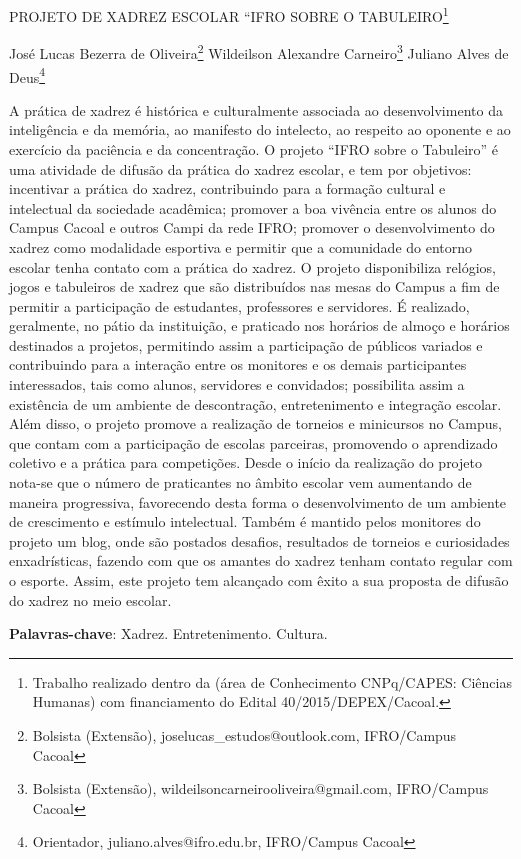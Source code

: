 \documentclass[article,12pt,onesidea,4paper,english,brazil]{abntex2}
\begin{document}
	
	
	\frenchspacing 
	
	\begin{center}
		\LARGE PROJETO DE XADREZ ESCOLAR “IFRO SOBRE O TABULEIRO\footnote{Trabalho realizado dentro da (área de Conhecimento CNPq/CAPES: Ciências Humanas) com financiamento do Edital 40/2015/DEPEX/Cacoal.}
		
		\normalsize
		José Lucas Bezerra de Oliveira\footnote{Bolsista (Extensão), joselucas\_estudos@outlook.com, IFRO/Campus Cacoal} 
		Wildeilson Alexandre Carneiro\footnote{Bolsista (Extensão), wildeilsoncarneirooliveira@gmail.com, IFRO/Campus Cacoal} 
		Juliano Alves de Deus\footnote{Orientador, juliano.alves@ifro.edu.br, IFRO/Campus Cacoal} 
	 
	\end{center}
	
	\noindent A prática de xadrez é histórica e culturalmente associada ao desenvolvimento da inteligência e da memória, ao manifesto do intelecto, ao respeito ao oponente e ao exercício da paciência e da concentração. O projeto “IFRO sobre o Tabuleiro” é uma atividade de difusão da prática do xadrez escolar, e tem por objetivos: incentivar a prática do xadrez, contribuindo para a formação cultural e intelectual da sociedade acadêmica; promover a boa vivência entre os alunos do Campus Cacoal e outros Campi da rede IFRO; promover o desenvolvimento do xadrez como modalidade esportiva e permitir que a comunidade do entorno escolar tenha contato com a prática do xadrez. O projeto disponibiliza relógios, jogos e tabuleiros de xadrez que são distribuídos nas mesas do Campus a fim de permitir a participação de estudantes, professores e servidores. É realizado, geralmente, no pátio da instituição, e praticado nos horários de almoço e horários destinados a projetos, permitindo assim a participação de públicos variados e contribuindo para a interação entre os monitores e os demais participantes interessados, tais como alunos, servidores e convidados; possibilita assim a existência de um ambiente de descontração, entretenimento e integração escolar. Além disso, o projeto promove a realização de torneios e minicursos no Campus, que contam com a participação de escolas parceiras, promovendo o aprendizado coletivo e a prática para competições. Desde o início da realização do projeto nota-se que o número de praticantes no âmbito escolar vem aumentando de maneira progressiva, favorecendo desta forma o desenvolvimento de um ambiente de crescimento e estímulo intelectual. Também é mantido pelos monitores do projeto um blog, onde são postados desafios, resultados de torneios e curiosidades enxadrísticas, fazendo com que os amantes do xadrez tenham contato regular com o esporte. Assim, este projeto tem alcançado com êxito a sua proposta de difusão do xadrez no meio escolar.
	
	\vspace{\onelineskip}
	
	\noindent
	\textbf{Palavras-chave}: Xadrez. Entretenimento. Cultura.
	
\end{document}
